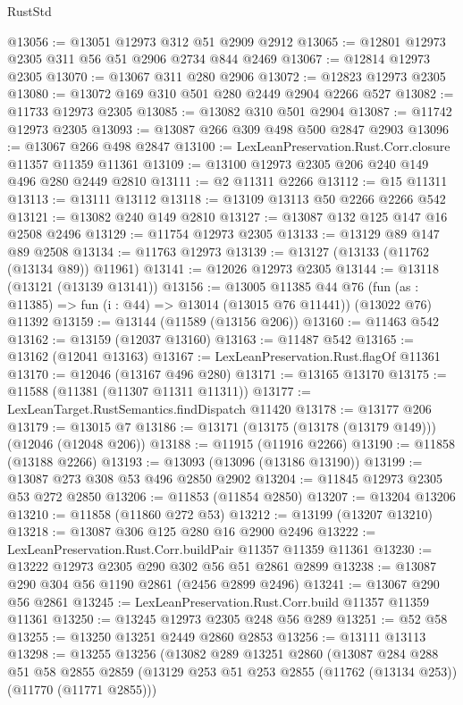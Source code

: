 \begin{lexlean}{RustStd}
\begin{coremodule}
@13056 := @13051 @12973 @312 @51 @2909 @2912
@13065 := @12801 @12973 @2305 @311 @56 @51 @2906 @2734 @844 @2469
@13067 := @12814 @12973 @2305
@13070 := @13067 @311 @280 @2906
@13072 := @12823 @12973 @2305
@13080 := @13072 @169 @310 @501 @280 @2449 @2904 @2266 @527
@13082 := @11733 @12973 @2305
@13085 := @13082 @310 @501 @2904
@13087 := @11742 @12973 @2305
@13093 := @13087 @266 @309 @498 @500 @2847 @2903
@13096 := @13067 @266 @498 @2847
@13100 := LexLeanPreservation.Rust.Corr.closure @11357 @11359 @11361
@13109 := @13100 @12973 @2305 @206 @240 @149 @496 @280 @2449 @2810
@13111 := @2 @11311 @2266
@13112 := @15 @11311
@13113 := @13111 @13112
@13118 := @13109 @13113 @50 @2266 @2266 @542
@13121 := @13082 @240 @149 @2810
@13127 := @13087 @132 @125 @147 @16 @2508 @2496
@13129 := @11754 @12973 @2305
@13133 := @13129 @89 @147 @89 @2508
@13134 := @11763 @12973
@13139 := @13127 (@13133 (@11762 (@13134 @89)) @11961)
@13141 := @12026 @12973 @2305
@13144 := @13118 (@13121 (@13139 @13141))
@13156 := @13005
    @11385
    @44
    @76
    (fun (as : @11385) => fun (i : @44) => @13014 (@13015 @76 @11441))
    (@13022 @76)
    @11392
@13159 := @13144 (@11589 (@13156 @206))
@13160 := @11463 @542
@13162 := @13159 (@12037 @13160)
@13163 := @11487 @542
@13165 := @13162 (@12041 @13163)
@13167 := LexLeanPreservation.Rust.flagOf @11361
@13170 := @12046 (@13167 @496 @280)
@13171 := @13165 @13170
@13175 := @11588 (@11381 (@11307 @11311 @11311))
@13177 := LexLeanTarget.RustSemantics.findDispatch @11420
@13178 := @13177 @206
@13179 := @13015 @7
@13186 := @13171 (@13175 (@13178 (@13179 @149))) (@12046 (@12048 @206))
@13188 := @11915 (@11916 @2266)
@13190 := @11858 (@13188 @2266)
@13193 := @13093 (@13096 (@13186 @13190))
@13199 := @13087 @273 @308 @53 @496 @2850 @2902
@13204 := @11845 @12973 @2305 @53 @272 @2850
@13206 := @11853 (@11854 @2850)
@13207 := @13204 @13206
@13210 := @11858 (@11860 @272 @53)
@13212 := @13199 (@13207 @13210)
@13218 := @13087 @306 @125 @280 @16 @2900 @2496
@13222 := LexLeanPreservation.Rust.Corr.buildPair @11357 @11359 @11361
@13230 := @13222 @12973 @2305 @290 @302 @56 @51 @2861 @2899
@13238 := @13087 @290 @304 @56 @1190 @2861 (@2456 @2899 @2496)
@13241 := @13067 @290 @56 @2861
@13245 := LexLeanPreservation.Rust.Corr.build @11357 @11359 @11361
@13250 := @13245 @12973 @2305 @248 @56 @289
@13251 := @52 @58
@13255 := @13250 @13251 @2449 @2860 @2853
@13256 := @13111 @13113
@13298 := @13255
    @13256
    (@13082
      @289
      @13251
      @2860
      (@13087
        @284
        @288
        @51
        @58
        @2855
        @2859
        (@13129 @253 @51 @253 @2855 (@11762 (@13134 @253)) (@11770 (@11771 @2855)))

\end{coremodule}
\end{lexlean}
